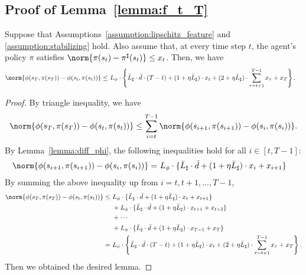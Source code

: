 \subsection{Proof of Lemma~\ref{lemma:f_t_T}}
\label{proof:A_2}
\begin{lemma}
    \label{lemma:9}
    Suppose that Assumptions~\ref{assumption:lipschitz_feature} and \ref{assumption:stabilizing} hold. Also assume that, at every time step $t$, the agent's policy $\pi$ satisfies $\norm{\pi(s_t) - \pi^\sharp(s_t)} \le x_t$. Then, we have
    \begin{align*}
        \norm{\phi(s_T, \pi(s_T)) - \phi(s_t, \pi(s_t))}
        \le &\ L_\phi \cdot \left\{\bar{L}_\sharp \cdot \bar{d} \cdot (T-t) + (1 + \eta \bar{L}_\sharp) \cdot x_t + (2 + \eta \bar{L}_\sharp) \cdot \sum_{\tau=t+1}^{T-1} x_\tau + x_{T} \right\}.
    \end{align*}
\end{lemma}

\begin{proof}
    By triangle inequality, we have
    \begin{align}
        \norm{\phi(s_T, \pi(s_T)) - \phi(s_t, \pi(s_t))} \le \sum_{i=t}^{T-1} \norm{\phi(s_{i+1}, \pi(s_{i+1})) - \phi(s_i, \pi(s_i))}.
    \end{align}
    By Lemma~\ref{lemma:diff_phi}, the following inequalities hold for all $i \in [t, T-1]$:
    \begin{align}
        \norm{\phi(s_{i+1}, \pi(s_{i+1})) - \phi(s_i, \pi(s_i))}
        = &\ L_\phi \cdot \{\bar{L}_\sharp \cdot \bar{d} + (1 + \eta \bar{L}_\sharp) \cdot x_i + x_{i+1}\}
    \end{align}
    By summing the above inequality up from $i = t, t+1, \ldots, T-1$,
    \begin{align*}
        \norm{\phi(s_T, \pi(s_T)) - \phi(s_t, \pi(s_t))}
        \le &\ L_\phi \cdot \{\bar{L}_\sharp \cdot \bar{d} + (1 + \eta \bar{L}_\sharp) \cdot x_t + x_{t+1}\} \\
        &\ + L_\phi \cdot \{\bar{L}_\sharp \cdot \bar{d} + (1 + \eta \bar{L}_\sharp) \cdot x_{t+1} + x_{t+2}\} \\
        &\ + \cdots \\
        &\ + L_\phi \cdot \{\bar{L}_\sharp \cdot \bar{d} + (1 + \eta \bar{L}_\sharp) \cdot x_{T-1} + x_{T}\} \\
        = &\ L_\phi \cdot \left\{\bar{L}_\sharp \cdot \bar{d} \cdot (T-t) + (1 + \eta \bar{L}_\sharp) \cdot x_t + (2 + \eta \bar{L}_\sharp) \cdot \sum_{\tau=t+1}^{T-1} x_\tau + x_{T} \right\}.
    \end{align*}
    Then we obtained the desired lemma.
\end{proof}


